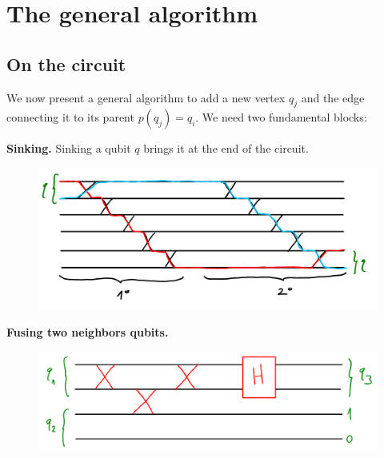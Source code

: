 \documentclass{article}
\begin{document}
\newpage

\section{The general algorithm}
\subsection{On the circuit}
We now present a general algorithm to add a new vertex $q_j$ and the edge connecting it to its parent $p(q_j) = q_i$. We need two fundamental blocks:

\textbf{Sinking.}
Sinking a qubit $q$ brings it at the end of the circuit.
\begin{figure}[H]
    \includegraphics[width=\textwidth]{pics/sinking.png}
\end{figure}

\textbf{Fusing two neighbors qubits.}
\begin{figure}[H]
    \includegraphics[width=\textwidth]{pics/fusion.png}
\end{figure}
\end{document}
